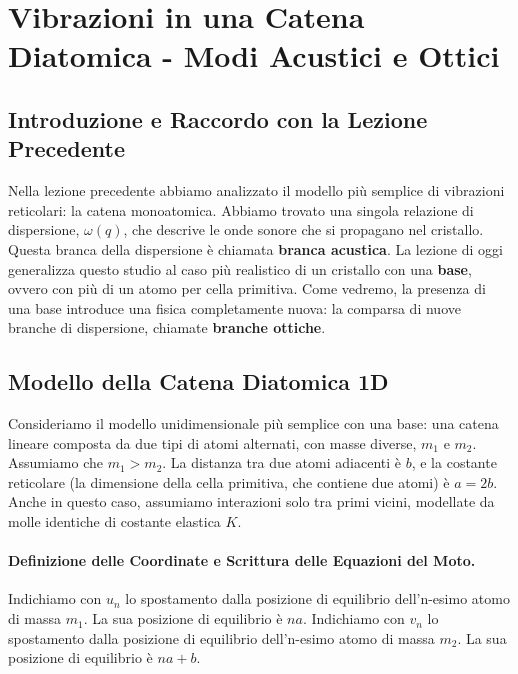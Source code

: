 \section{Vibrazioni in una Catena Diatomica - Modi Acustici e Ottici}

\subsection{Introduzione e Raccordo con la Lezione Precedente}
Nella lezione precedente abbiamo analizzato il modello più semplice di vibrazioni reticolari: la catena monoatomica. Abbiamo trovato una singola relazione di dispersione, \(\omega(q)\), che descrive le onde sonore che si propagano nel cristallo. Questa branca della dispersione è chiamata \textbf{branca acustica}. La lezione di oggi generalizza questo studio al caso più realistico di un cristallo con una \textbf{base}, ovvero con più di un atomo per cella primitiva. Come vedremo, la presenza di una base introduce una fisica completamente nuova: la comparsa di nuove branche di dispersione, chiamate \textbf{branche ottiche}.

\subsection{Modello della Catena Diatomica 1D}
Consideriamo il modello unidimensionale più semplice con una base: una catena lineare composta da due tipi di atomi alternati, con masse diverse, \(m_1\) e \(m_2\). Assumiamo che \(m_1 > m_2\). La distanza tra due atomi adiacenti è \(b\), e la costante reticolare (la dimensione della cella primitiva, che contiene due atomi) è \(a = 2b\). Anche in questo caso, assumiamo interazioni solo tra primi vicini, modellate da molle identiche di costante elastica \(K\).

\paragraph{Definizione delle Coordinate e Scrittura delle Equazioni del Moto.}
Indichiamo con \(u_n\) lo spostamento dalla posizione di equilibrio dell'n-esimo atomo di massa \(m_1\). La sua posizione di equilibrio è \(na\).
Indichiamo con \(v_n\) lo spostamento dalla posizione di equilibrio dell'n-esimo atomo di massa \(m_2\). La sua posizione di equilibrio è \(na+b\).

